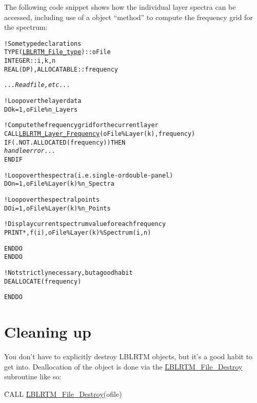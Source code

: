 The following code snippet shows how the individual layer spectra can be accessed, including use of a \Layer{} object ``method'' to compute the frequency grid for the spectrum:
\begin{alltt}
  ! Some type declarations
  TYPE(\hyperref[fig:LBLRTM_File_type_structure]{LBLRTM_File_type}) :: oFile
  INTEGER :: i, k, n
  REAL(DP), ALLOCATABLE :: frequency
  
  \textrm{\textit{...Read file, etc...}}
  
  ! Loop over the layer data
  DO k = 1, oFile\%n_Layers
  
    ! Compute the frequency grid for the current layer
    CALL \hyperref[sec:LBLRTM_Layer_Frequency_interface]{LBLRTM_Layer_Frequency}(oFile\%Layer(k), frequency)
    IF ( .NOT. ALLOCATED(frequency) ) THEN
      \textrm{\textit{handle error...}}
    END IF
    
    ! Loop over the spectra (i.e. single- or double-panel)
    DO n = 1, oFile\%Layer(k)\%n_Spectra
    
      ! Loop over the spectral points
      DO i = 1, oFile\%Layer(k)\%n_Points
    
        ! Display current spectrum value for each frequency
        PRINT *, f(i), oFile\%Layer(k)\%Spectrum(i,n)
        
      END DO
    END DO
    
    ! Not strictly necessary, but a good habit
    DEALLOCATE(frequency)
    
  END DO\end{alltt}




\section{Cleaning up}

You don't have to explicitly destroy LBLRTM \File{} objects, but it's a good habit to get into. Deallocation of the \File{} object is done via the \hyperref[sec:LBLRTM_File_Destroy_interface]{\f{LBLRTM\_File\_Destroy}} subroutine like so:

\hspace{0.4cm}\f{CALL }\hyperref[sec:LBLRTM_File_Destroy_interface]{\f{LBLRTM\_File\_Destroy}}(ofile)

